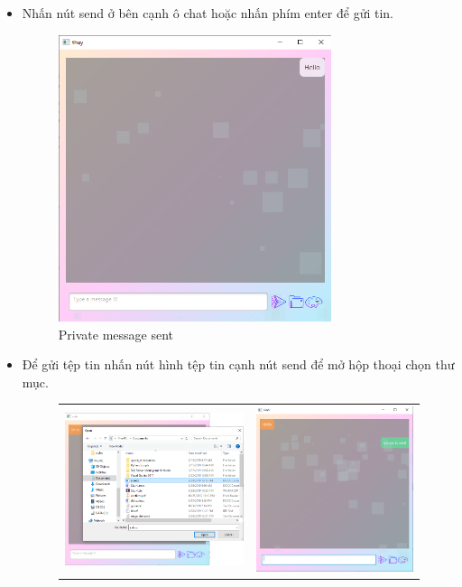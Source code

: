 \documentclass[a4paper]{article}
\begin{document}
\begin{itemize}
\begin{figure}[h!]
			\label{fig:my_label}
		\end{figure}
		\item Nhấn nút send ở bên cạnh ô chat hoặc nhấn phím enter để gửi tin.
		\begin{figure}[h!]
			\centering
			\includegraphics[width=8cm]{message-sent-private.PNG}
			\caption{Private message sent}
			\label{fig:my_label}
		\end{figure}
		\newpage
		\item Để gửi tệp tin nhấn nút hình tệp tin cạnh nút send để mở hộp thoại chọn thư mục.
		\begin{figure}[h!]
			\centering
			\begin{tabular}{c c}
			\includegraphics[width=8cm]{browse-directory-private.PNG} &
			\includegraphics[width=7cm]{private-file-sent.PNG}

\end{tabular}
\end{figure}
\end{itemize}
\end{document}
